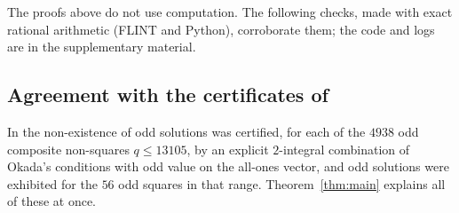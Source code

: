 \documentclass[11pt]{amsart}
\theoremstyle{definition}
\theoremstyle{remark}
\numberwithin{equation}{section}
\begin{document}
The proofs above do not use computation.
The following checks, made with exact rational arithmetic (FLINT \cite{FLINT} and Python), corroborate them; the code and logs are in the supplementary material.

\subsection{Agreement with the certificates of \texorpdfstring{\cite{Kei26}}{[Kei26]}}
In \cite{Kei26} the non-existence of odd solutions was certified, for each of the $4938$ odd composite non-squares $q\le13105$, by an explicit $2$-integral combination of Okada's conditions with odd value on the all-ones vector, and odd solutions were exhibited for the $56$ odd squares in that range.
Theorem~\ref{thm:main} explains all of these at once.
\end{document}
